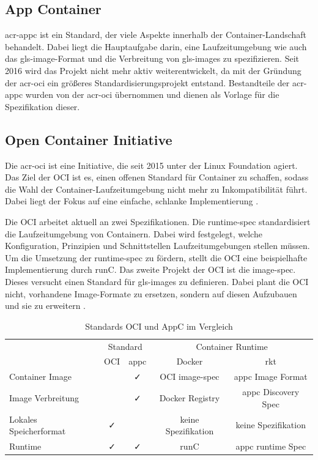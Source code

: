 \subsection{App Container}
\label{sec:appc}
\Gls{acr-appc} ist ein Standard, der viele Aspekte innerhalb der Container-Landschaft behandelt. Dabei liegt die Hauptaufgabe darin, eine Laufzeitumgebung wie auch das \gls{gls-image}-Format und die Verbreitung von \glspl{gls-image} zu spezifizieren. Seit 2016 wird das Projekt nicht mehr aktiv weiterentwickelt, da mit der Gründung der \gls{acr-oci} ein größeres Standardisierungsprojekt entstand. Bestandteile der \gls{acr-appc} wurden von der \gls{acr-oci} übernommen und dienen als Vorlage für die Spezifikation dieser.

\subsection{Open Container Initiative}
\label{sec:oci}
Die \gls{acr-oci} ist eine Initiative, die seit 2015 unter der Linux Foundation agiert. Das Ziel der OCI ist es, einen offenen Standard für Container zu schaffen, sodass die Wahl der Container-Laufzeitumgebung nicht mehr zu Inkompatibilität führt. Dabei liegt der Fokus auf eine einfache, schlanke Implementierung \citep{OpenContainerInitiative}. 

Die OCI arbeitet aktuell an zwei Spezifikationen. Die runtime-spec standardisiert die Laufzeitumgebung  von Containern. Dabei wird festgelegt, welche Konfiguration, Prinzipien und Schnittstellen Laufzeitumgebungen stellen müssen. Um die Umsetzung der runtime-spec zu fördern, stellt die OCI eine beispielhafte Implementierung durch runC. Das zweite Projekt der OCI ist die image-spec. Dieses versucht einen Standard für \glspl{gls-image} zu definieren. Dabei plant die OCI nicht, vorhandene Image-Formate zu ersetzen, sondern auf diesen Aufzubauen und sie zu erweitern \citep{OpenContainerInitiative}.
\begin{table}[h]
	\begin{center}
		\begin{tabular}{lcccc}
			\toprule
			& \multicolumn{2}{c}{Standard} & \multicolumn{2}{c}{Container Runtime}\\
			\cmidrule{2-5}
			& OCI		& appc		& Docker			& rkt					\\
			\midrule
			Container Image			& \faTimes	& \faCheck	& OCI image-spec 	& appc Image Format		\\
			Image Verbreitung		& \faTimes	& \faCheck	& Docker Registry	& appc Discovery Spec 	\\
			Lokales Speicherformat	& \faCheck	& \faTimes	& keine Spezifikation& keine Spezifikation	\\
			\midrule
			Runtime					& \faCheck	& \faCheck	& runC 				& appc runtime Spec		\\
			\bottomrule
		\end{tabular}
	\end{center}
	\caption{Standards OCI und AppC im Vergleich \citep{MakingSenseofContainerStandardsandFoundations:OCICNCFAppcandRkt}}
	\label{tab:ociVSappc}
\end{table}

